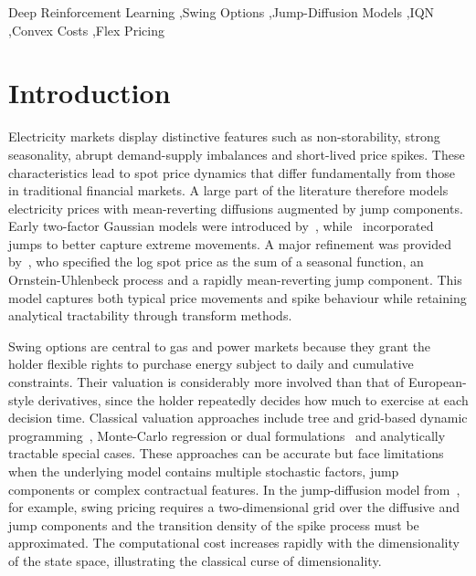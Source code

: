 \documentclass[a4paper,fleqn]{cas-dc}
\begin{document}
\begin{keywords}
Deep Reinforcement Learning \sep Swing Options \sep Jump-Diffusion Models \sep IQN \sep Convex Costs \sep Flex Pricing
\end{keywords}


\maketitle


\section{Introduction}
\label{Introduction}

Electricity markets display distinctive features such as non-storability, strong seasonality, abrupt demand-supply imbalances and short-lived price spikes. These characteristics lead to spot price dynamics that differ fundamentally from those in traditional financial markets. A large part of the literature therefore models electricity prices with mean-reverting diffusions augmented by jump components. Early two-factor Gaussian models were introduced by~\cite{lucia2002electricity}, while~\cite{cartea2005pricing} incorporated jumps to better capture extreme movements. A major refinement was provided by~\cite{Hambly2009}, who specified the log spot price as the sum of a seasonal function, an Ornstein-Uhlenbeck process and a rapidly mean-reverting jump component. This model captures both typical price movements and spike behaviour while retaining analytical tractability through transform methods.

Swing options are central to gas and power markets because they grant the holder flexible rights to purchase energy subject to daily and cumulative constraints. Their valuation is considerably more involved than that of European-style derivatives, since the holder repeatedly decides how much to exercise at each decision time. Classical valuation approaches include tree and grid-based dynamic programming~\cite{jaillet2004valuation}, Monte-Carlo regression or dual formulations~\cite{meinshausen2004monte,carmona2004swing} and analytically tractable special cases. These approaches can be accurate but face limitations when the underlying model contains multiple stochastic factors, jump components or complex contractual features. In the jump-diffusion model from~\cite{Hambly2009}, for example, swing pricing requires a two-dimensional grid over the diffusive and jump components and the transition density of the spike process must be approximated. The computational cost increases rapidly with the dimensionality of the state space, illustrating the classical curse of dimensionality.
\end{document}

